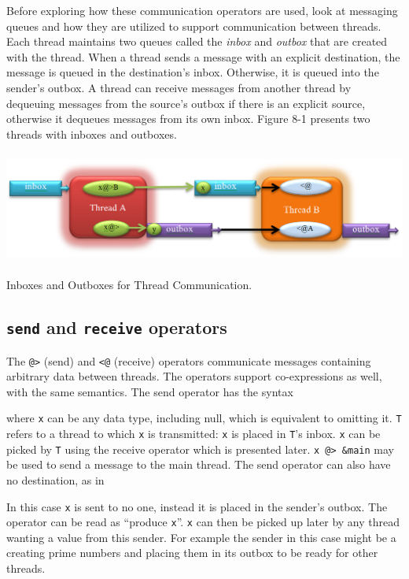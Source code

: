 Before exploring how these communication operators are used, look
at messaging queues and how they are utilized to support communication between
threads.  Each thread maintains two queues called the \emph{inbox} and
\emph{outbox} that are created with the thread.  When a thread sends a message
with an explicit destination, the message is queued in the destination's
inbox. Otherwise, it is queued into the sender's outbox.  A thread can receive
messages from another thread by dequeuing messages from the source's outbox if
there is an explicit source, otherwise it dequeues messages from its own inbox.
Figure 8-1 presents two threads with inboxes and outboxes.
\begin{center}
  \includegraphics[width=5.75in,height=1.45in]{ub-img/thread-fig1.png}
\end{center}
\vspace{-0.25cm}{\sffamily\bfseries Figure 8-1:}
{\sffamily Inboxes and Outboxes for Thread Communication.}


\subsection*{\texttt{send} and \texttt{receive} operators}

The \texttt{@>} (send) and \texttt{{<}@} (receive) operators communicate
messages containing arbitrary data between threads. The operators support
co-expressions as well, with the same semantics. The send operator has the
syntax


\noindent
where \texttt{x} can be any data type, including null, which is equivalent to omitting
it. \texttt{T} refers to a thread to which \texttt{x} is transmitted: \texttt{x}
is placed in \texttt{T}'s inbox.  \texttt{x} can be picked by \texttt{T} using
the receive operator which is presented later.
\texttt{x @> \&main} may be used to send a message to the main thread.
The send operator can also have no destination, as in


In this case \texttt{x} is sent to no one, instead it is placed in the sender's
outbox. The operator can be read as ``produce \texttt{x}''.  \texttt{x} can then
be picked up later by any thread wanting a value from this sender.  For example
the sender in this case might be a creating prime numbers and placing them in
its outbox to be ready for other threads.

